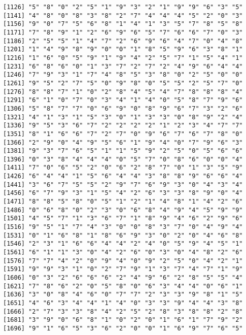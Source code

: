 \documentclass{article}
\begin{document}
\begin{itemize}
\begin{scriptsize}
\begin{verbatim}
[1126] "5" "8" "0" "2" "5" "1" "9" "3" "2" "1" "9" "9" "6" "3" "5"
[1141] "4" "8" "0" "8" "3" "8" "2" "7" "4" "4" "4" "5" "2" "0" "3"
[1156] "9" "0" "7" "5" "6" "8" "1" "4" "1" "3" "5" "7" "8" "5" "8"
[1171] "7" "8" "9" "1" "2" "6" "9" "6" "5" "7" "6" "6" "7" "0" "3"
[1186] "2" "5" "5" "1" "4" "7" "2" "6" "9" "6" "4" "7" "0" "4" "8"
[1201] "1" "4" "9" "8" "9" "0" "0" "1" "8" "5" "9" "6" "3" "8" "1"
[1216] "1" "6" "0" "5" "9" "1" "9" "4" "2" "5" "7" "1" "5" "4" "1"
[1231] "6" "8" "6" "0" "1" "3" "7" "2" "7" "2" "4" "9" "6" "4" "4"
[1246] "7" "9" "3" "1" "7" "4" "8" "5" "3" "8" "0" "2" "5" "0" "0"
[1261] "9" "5" "2" "7" "5" "0" "9" "8" "0" "5" "5" "2" "5" "7" "0"
[1276] "8" "8" "7" "1" "0" "2" "8" "4" "5" "4" "7" "8" "8" "8" "4"
[1291] "6" "1" "0" "7" "0" "3" "4" "1" "4" "0" "5" "8" "7" "9" "6"
[1306] "5" "8" "7" "7" "0" "6" "9" "0" "8" "9" "6" "7" "3" "2" "6"
[1321] "4" "1" "3" "1" "5" "3" "0" "1" "3" "3" "0" "8" "9" "2" "4"
[1336] "9" "5" "3" "6" "7" "2" "2" "2" "2" "1" "2" "3" "4" "7" "7"
[1351] "8" "1" "6" "6" "7" "2" "7" "0" "9" "6" "7" "6" "7" "8" "0"
[1366] "2" "9" "0" "4" "9" "5" "6" "1" "9" "4" "0" "7" "9" "6" "3"
[1381] "9" "3" "7" "6" "5" "1" "1" "5" "9" "2" "5" "0" "5" "6" "6"
[1396] "0" "3" "8" "4" "4" "4" "0" "5" "7" "0" "8" "6" "0" "0" "4"
[1411] "7" "0" "6" "5" "2" "0" "6" "2" "8" "7" "0" "1" "3" "5" "9"
[1426] "6" "4" "4" "1" "5" "6" "4" "4" "3" "8" "8" "9" "6" "6" "4"
[1441] "3" "6" "7" "5" "5" "2" "9" "7" "6" "9" "3" "0" "4" "3" "4"
[1456] "6" "7" "9" "3" "1" "5" "4" "2" "6" "3" "3" "8" "9" "0" "4"
[1471] "8" "8" "5" "8" "0" "5" "1" "2" "1" "4" "8" "1" "4" "2" "6"
[1486] "0" "6" "8" "0" "2" "3" "0" "6" "8" "4" "9" "4" "5" "9" "9"
[1501] "4" "5" "7" "1" "3" "6" "7" "1" "8" "9" "4" "6" "2" "9" "6"
[1516] "9" "5" "1" "7" "4" "3" "0" "0" "8" "3" "7" "0" "4" "9" "4"
[1531] "0" "1" "6" "8" "1" "8" "6" "9" "3" "0" "2" "0" "4" "6" "8"
[1546] "2" "3" "1" "6" "6" "4" "4" "2" "4" "0" "5" "9" "4" "5" "1"
[1561] "6" "1" "1" "3" "0" "4" "2" "6" "0" "3" "0" "4" "8" "2" "6"
[1576] "7" "7" "4" "2" "0" "9" "4" "0" "9" "2" "5" "0" "4" "2" "1"
[1591] "9" "9" "3" "1" "0" "2" "7" "9" "1" "3" "7" "4" "7" "1" "9"
[1606] "0" "3" "2" "6" "6" "6" "2" "4" "9" "6" "2" "8" "5" "5" "4"
[1621] "7" "8" "6" "2" "0" "5" "8" "0" "6" "3" "4" "4" "0" "6" "1"
[1636] "3" "0" "8" "4" "6" "0" "7" "7" "2" "3" "3" "9" "8" "1" "5"
[1651] "4" "6" "3" "4" "4" "1" "4" "0" "3" "3" "9" "4" "4" "3" "8"
[1666] "2" "7" "3" "3" "8" "4" "2" "5" "2" "8" "3" "8" "8" "2" "8"
[1681] "3" "9" "0" "6" "8" "1" "0" "2" "0" "1" "6" "1" "7" "9" "2"
[1696] "9" "1" "6" "5" "3" "6" "2" "0" "0" "1" "6" "9" "7" "6" "5"

\end{verbatim}
\end{scriptsize}
\end{itemize}
\end{document}
